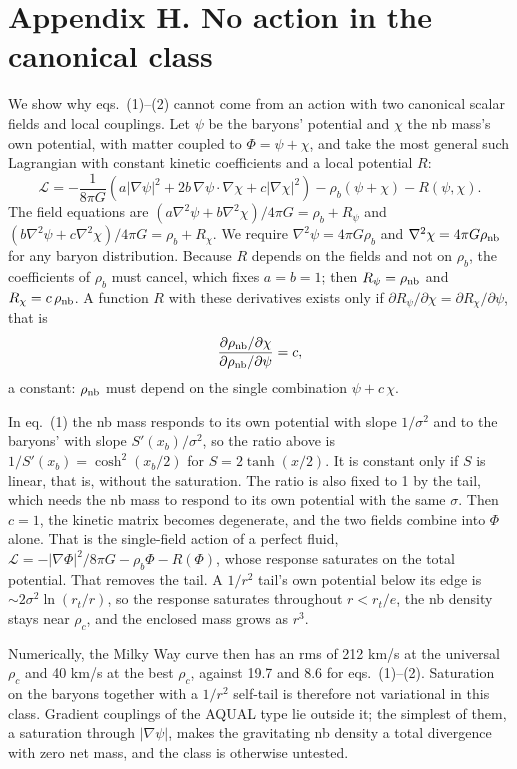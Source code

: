 \documentclass[
  10pt,
]{article}
\begin{document}
\section{Appendix H. No action in the canonical class}\label{appendix-h}

We show why eqs.~(1)--(2) cannot come from an action with two canonical scalar fields and local couplings. Let $\psi$ be the baryons' potential and $\chi$ the nb mass's own potential, with matter coupled to $\Phi=\psi+\chi$, and take the most general such Lagrangian with constant kinetic coefficients and a local potential $R$:
\[
\mathcal{L}=-\frac{1}{8\pi G}\left(a|\nabla\psi|^2+2b\,\nabla\psi\cdot\nabla\chi+c|\nabla\chi|^2\right)-\rho_b(\psi+\chi)-R(\psi,\chi).
\]
The field equations are $(a\nabla^2\psi+b\nabla^2\chi)/4\pi G=\rho_b+R_\psi$ and $(b\nabla^2\psi+c\nabla^2\chi)/4\pi G=\rho_b+R_\chi$. We require $\nabla^2\psi=4\pi G\rho_b$ and $\nabla^2\chi=4\pi G\rho_{\rm nb}$ for any baryon distribution. Because $R$ depends on the fields and not on $\rho_b$, the coefficients of $\rho_b$ must cancel, which fixes $a=b=1$; then $R_\psi=\rho_{\rm nb}$ and $R_\chi=c\,\rho_{\rm nb}$. A function $R$ with these derivatives exists only if $\partial R_\psi/\partial\chi=\partial R_\chi/\partial\psi$, that is
\[
\frac{\partial\rho_{\rm nb}/\partial\chi}{\partial\rho_{\rm nb}/\partial\psi}=c,
\]
a constant: $\rho_{\rm nb}$ must depend on the single combination $\psi+c\,\chi$.

In eq.~(1) the nb mass responds to its own potential with slope $1/\sigma^2$ and to the baryons' with slope $S'(x_b)/\sigma^2$, so the ratio above is $1/S'(x_b)=\cosh^2(x_b/2)$ for $S=2\tanh(x/2)$. It is constant only if $S$ is linear, that is, without the saturation. The ratio is also fixed to 1 by the tail, which needs the nb mass to respond to its own potential with the same $\sigma$. Then $c=1$, the kinetic matrix becomes degenerate, and the two fields combine into $\Phi$ alone. That is the single-field action of a perfect fluid, $\mathcal{L}=-|\nabla\Phi|^2/8\pi G-\rho_b\Phi-R(\Phi)$, whose response saturates on the total potential. That removes the tail. A $1/r^2$ tail's own potential below its edge is $\sim2\sigma^2\ln(r_t/r)$, so the response saturates throughout $r<r_t/e$, the nb density stays near $\rho_c$, and the enclosed mass grows as $r^3$.

Numerically, the Milky Way curve then has an rms of 212 km/s at the universal $\rho_c$ and 40 km/s at the best $\rho_c$, against 19.7 and 8.6 for eqs.~(1)--(2). Saturation on the baryons together with a $1/r^2$ self-tail is therefore not variational in this class. Gradient couplings of the AQUAL type lie outside it; the simplest of them, a saturation through $|\nabla\psi|$, makes the gravitating nb density a total divergence with zero net mass, and the class is otherwise untested.
\end{document}
